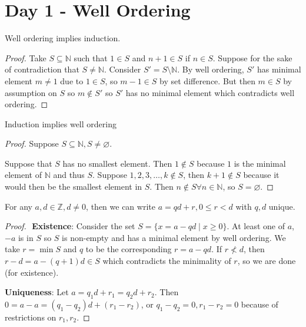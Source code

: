 \section{Day 1 - Well Ordering}

\begin{prop}
Well ordering implies induction.
\end{prop}

\begin{proof}
Take $S \subseteq \mathbb{N}$ such that $1 \in S$ and $n + 1 \in S$ if
$n \in S$. Suppose for the sake of contradiction that $S \neq
\mathbb{N}$. Consider $S' = S \setminus \mathbb{N}$. By well ordering,
$S'$ has minimal element $m \neq 1$ due to $1 \in S$, so $m - 1 \in S$
by set difference. But then $m \in S$ by assumption on $S$ so $m \not
\in S'$ so $S'$ has no minimal element which contradicts well ordering.
\end{proof}

\begin{prop}
Induction implies well ordering
\end{prop}

\begin{proof}
Suppose $S \subseteq \mathbb{N}, S \neq \varnothing$.

Suppose that $S$ has no smallest element. Then $1 \not \in S$ because
$1$ is the minimal element of $\mathbb{N}$ and thus $S$. Suppose $1, 2,
3, \dots, k \not \in S$, then $k + 1 \not \in S$ because it would then be
the smallest element in $S$. Then $n \not \in S \forall n \in
\mathbb{N}$, so $S = \varnothing$.
\end{proof}

\begin{prop}
For any $a, d \in \mathbb{Z}, d \neq 0$, then we can write $a = qd + r,
0 \leq r < d$ with $q, d$ unique.
\end{prop}

\begin{proof}
$ $\newline
\textbf{Existence}: Consider the set $S = \lbrace x = a - qd \mid x
\geq 0 \rbrace$. At least one of $a$, $-a$ is in $S$ so $S$ is non-empty
and has a minimal element by well ordering. We take $r = \min S$ and $q$
to be the corresponding $r = a - qd$. If $r \not < d$, then $r - d = a -
(q + 1)d \in S$ which contradicts the minimality of $r$, so we are done
(for existence).

\textbf{Uniqueness}: Let $a = q_1 d + r_1 = q_2 d + r_2$. Then $0 = a -
a = (q_1 - q_2) d + (r_1 - r_2)$, or $q_1 - q_2 = 0, r_1 - r_2 = 0$
because of restrictions on $r_1, r_2$.
\end{proof}
